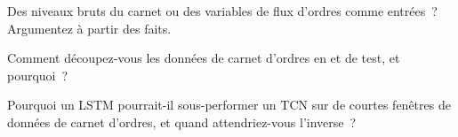 \begin{interviewq}\label{iq:ml:sequence-models-on-order-books:4}
Des niveaux bruts du carnet ou des variables de flux d'ordres comme entrées~? Argumentez à partir des faits.
\end{interviewq}

\begin{interviewq}\label{iq:ml:sequence-models-on-order-books:5}
Comment découpez-vous les données de carnet d'ordres en  et de test, et pourquoi~?
\end{interviewq}

\begin{interviewq}\label{iq:ml:sequence-models-on-order-books:6}
Pourquoi un LSTM pourrait-il sous-performer un TCN sur de courtes fenêtres de données de carnet d'ordres, et quand attendriez-vous l'inverse~?
\end{interviewq}
